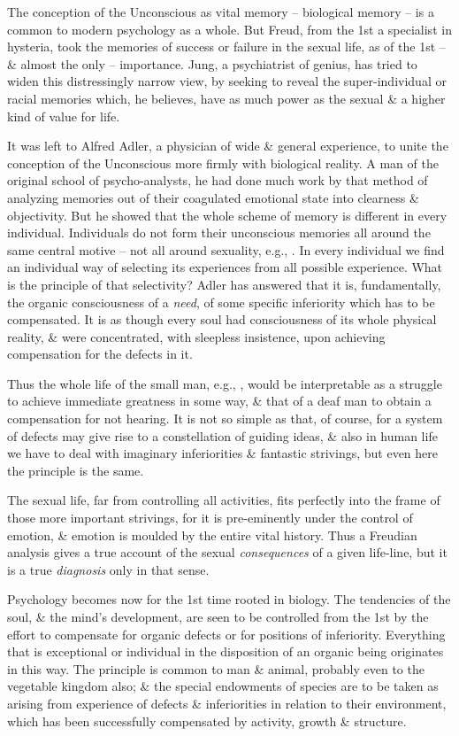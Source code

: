 \documentclass{article}
\numberwithin{equation}{section}
\begin{document}
The conception of the Unconscious as vital memory -- biological memory -- is a common to modern psychology as a whole. But Freud, from the 1st a specialist in hysteria, took the memories of success or failure in the sexual life, as of the 1st -- \& almost the only -- importance. Jung, a psychiatrist of genius, has tried to widen this distressingly narrow view, by seeking to reveal the super-individual or racial memories which, he believes, have as much power as the sexual \& a higher kind of value for life.

It was left to Alfred Adler, a physician of wide \& general experience, to unite the conception of the Unconscious more firmly with biological reality. A man of the original school of psycho-analysts, he had done much work by that method of analyzing memories out of their coagulated emotional state into clearness \& objectivity. But he showed that the whole scheme of memory is different in every individual. Individuals do not form their unconscious memories all around the same central motive -- not all around sexuality, e.g., . In every individual we find an individual way of selecting its experiences from all possible experience. What is the principle of that selectivity? Adler has answered that it is, fundamentally, the organic consciousness of a \textit{need}, of some specific inferiority which has to be compensated. It is as though every soul had consciousness of its whole physical reality, \& were concentrated, with sleepless insistence, upon achieving compensation for the defects in it.

Thus the whole life of the small man, e.g., , would be interpretable as a struggle to achieve immediate greatness in some way, \& that of a deaf man to obtain a compensation for not hearing. It is not so simple as that, of course, for a system of defects may give rise to a constellation of guiding ideas, \& also in human life we have to deal with imaginary inferiorities \& fantastic strivings, but even here the principle is the same.

The sexual life, far from controlling all activities, fits perfectly into the frame of those more important strivings, for it is pre-eminently under the control of emotion, \& emotion is moulded by the entire vital history. Thus a Freudian analysis gives a true account of the sexual \textit{consequences} of a given life-line, but it is a true \textit{diagnosis} only in that sense.

Psychology becomes now for the 1st time rooted in biology. The tendencies of the soul, \& the mind's development, are seen to be controlled from the 1st by the effort to compensate for organic defects or for positions of inferiority. Everything that is exceptional or individual in the disposition of an organic being originates in this way. The principle is common to man \& animal, probably even to the vegetable kingdom also; \& the special endowments of species are to be taken as arising from experience of defects \& inferiorities in relation to their environment, which has been successfully compensated by activity, growth \& structure.
\end{document}
